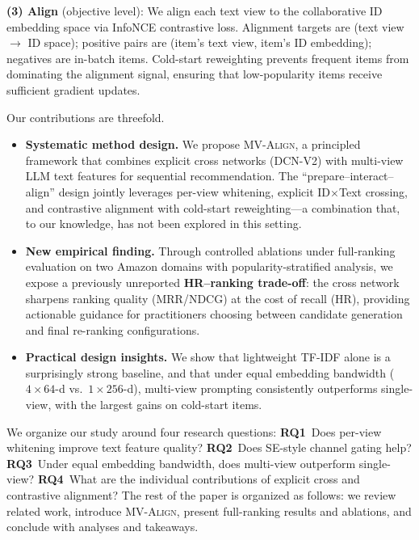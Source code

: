 \documentclass[sigconf,natbib=true,anonymous]{acmart}
\newcommand{\model}{\textsc{MV-Align}\xspace}
\newcommand{\tfidf}{\textsc{TF-IDF}\xspace}
\newcommand{\llm}{\textsc{LLM}\xspace}
\begin{document}
\textbf{(3) Align} (objective level): We align each text view
to the collaborative ID embedding space via InfoNCE contrastive
loss. Alignment targets are (text view $\to$ ID space); positive
pairs are (item's text view, item's ID embedding); negatives are
in-batch items. Cold-start reweighting prevents frequent items
from dominating the alignment signal, ensuring that
low-popularity items receive sufficient gradient updates.

Our contributions are threefold.
\begin{itemize}[leftmargin=*,itemsep=1pt]
  \item \textbf{Systematic method design.} We propose \model, a
    principled framework that combines explicit cross networks (DCN-V2)
    with multi-view \llm text features for sequential recommendation.
    The ``prepare--interact--align'' design jointly leverages per-view
    whitening, explicit ID$\times$Text crossing, and contrastive
    alignment with cold-start reweighting---a combination that, to our
    knowledge, has not been explored in this setting.
  \item \textbf{New empirical finding.} Through controlled ablations
    under full-ranking evaluation on two Amazon domains with
    popularity-stratified analysis, we expose a previously unreported
    \textbf{HR--ranking trade-off}: the cross network sharpens ranking
    quality (MRR/NDCG) at the cost of recall (HR), providing
    actionable guidance for practitioners choosing between candidate
    generation and final re-ranking configurations.
  \item \textbf{Practical design insights.} We show that lightweight
    \tfidf alone is a surprisingly strong baseline, and that under
    equal embedding bandwidth ($4{\times}64$-d vs.\ $1{\times}256$-d),
    multi-view prompting consistently outperforms single-view,
    with the largest gains on cold-start items.
\end{itemize}
We organize our study around four research questions:
\textbf{RQ1}~Does per-view whitening improve text feature quality?
\textbf{RQ2}~Does SE-style channel gating help?
\textbf{RQ3}~Under equal embedding bandwidth, does multi-view outperform single-view?
\textbf{RQ4}~What are the individual contributions of explicit cross and contrastive alignment?
The rest of the paper is organized as follows: we review
related work, introduce \model, present full-ranking results
and ablations, and conclude with analyses and takeaways.

\end{document}
